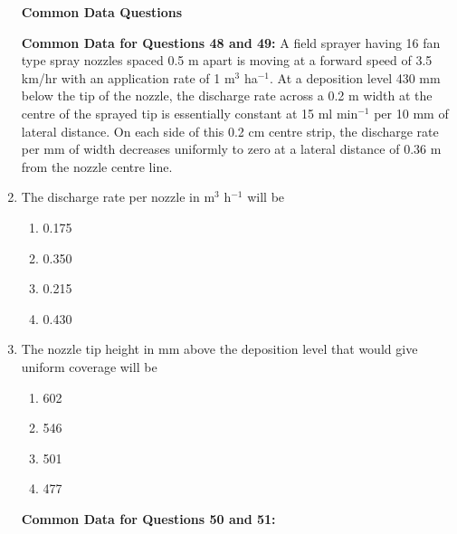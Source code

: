 \documentclass[journal]{IEEEtran}
\numberwithin{equation}{enumi}
\numberwithin{figure}{enumi}
\begin{document}
\begin{enumerate}
\textbf{Common Data Questions}

\textbf{Common Data for Questions 48 and 49:}
\vspace{0.5cm} \newline
A field sprayer having 16 fan type spray nozzles spaced 0.5 m apart is moving at a forward speed of 3.5 km/hr with an application rate of 1 m$^3$ ha$^{-1}$. At a deposition level 430 mm below the tip of the nozzle, the discharge rate across a 0.2 m width at the centre of the sprayed tip is essentially constant at 15 ml min$^{-1}$ per 10 mm of lateral distance. On each side of this 0.2 cm centre strip, the discharge rate per mm of width decreases uniformly to zero at a lateral distance of 0.36 m from the nozzle centre line.

\item  The discharge rate per nozzle in m$^3$ h$^{-1}$ will be
\hfill{}
\begin{multicols}{4}
    \begin{enumerate}
    \item 0.175   
    \item  0.350
    \item 0.215
    \item 0.430
    \end{enumerate}
    \end{multicols}  



\item  The nozzle tip height in mm above the deposition level that would give uniform coverage will be  
\hfill{}
\begin{multicols}{4}
    \begin{enumerate}
    \item 602
    \item  546 
    \item 501
    \item 477
    \end{enumerate}
    \end{multicols}  




\textbf{Common Data for Questions 50 and 51:}


\end{enumerate}
\end{document}
